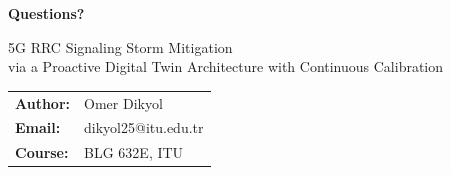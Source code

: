 \documentclass[aspectratio=169,t]{beamer}
\begin{document}
{
\begin{frame}[noframenumbering,c]
  \begin{center}
    {\LARGE\bfseries\color{ITUblue} Questions?}

    \vspace{20pt}
    {\large 5G RRC Signaling Storm Mitigation\\
    via a Proactive Digital Twin Architecture with Continuous Calibration}

    \vspace{16pt}
    \begin{tabular}{ll}
      \textbf{Author:}  & Omer Dikyol \\
      \textbf{Email:}   & dikyol25@itu.edu.tr \\
      \textbf{Course:}  & BLG 632E, ITU \\
    \end{tabular}
  \end{center}
\end{frame}
}
\end{document}
